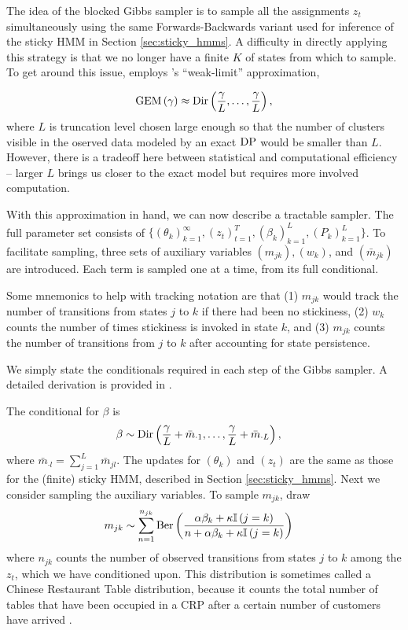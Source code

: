 \documentclass[14pt]{extreport}
\begin{document}
The idea of the blocked Gibbs sampler is to sample all the assignments $z_t$
simultaneously using the same Forwards-Backwards variant used for inference of
the sticky HMM in Section \ref{sec:sticky_hmms}. A difficulty in directly
applying this strategy is that we no longer have a finite $K$ of states from
which to sample. To get around this issue, \citep{fox2008hdp} employs
\citep{ishwaran2002exact}'s ``weak-limit'' approximation,

\begin{align*}
  \text{GEM}\left(\gamma\right) \approx \textnormal{Dir}\left(\frac{\gamma}{L}, \dots, \frac{\gamma}{L}\right),
\end{align*}
where $L$ is truncation level chosen large enough so that the number of clusters
visible in the oserved data modeled by an exact $\textnormal{DP}$ would be smaller than $L$.
However, there is a tradeoff here between statistical and computational
efficiency -- larger $L$ brings us closer to the exact model but requires more
involved computation.

With this approximation in hand, we can now describe a tractable sampler. The
full parameter set consists of $\{\left(\theta_k\right)_{k = 1}^{\infty},
\left(z_t\right)_{t = 1}^{T}, \left(\beta_{k}\right)_{k = 1}^{L},
\left(P_{k}\right)_{k = 1}^{L} \}$. To facilitate sampling, three sets of
auxiliary variables $\left(m_{jk}\right), \left(w_k\right)$, and
  $\left(\bar{m}_{jk}\right)$ are introduced. Each term is sampled one at a
  time, from its full conditional.

Some mnemonics to help with tracking notation are that (1) $m_{jk}$ would track
the number of transitions from states $j$ to $k$ if there had been no
stickiness, (2) $w_k$ counts the number of times stickiness is invoked in state
$k$, and (3) $m_{jk}$ counts the number of transitions from $j$ to $k$ after
accounting for state persistence.

We simply state the conditionals required in each step of the Gibbs sampler. A
detailed derivation is provided in \citep{fox2009bayesian}.

The conditional for $\beta$ is
\begin{align*}
  \beta &\sim \textnormal{Dir}\left(\frac{\gamma}{L} + \bar{m}_{\cdot 1}, \dots, \frac{\gamma}{L} + \bar{m}_{\cdot L}\right),
\end{align*}
where $\bar{m}_{\cdot l} = \sum_{j = 1}^{L} \bar{m}_{jl}$. The updates for
$\left(\theta_k\right)$ and $\left(z_t\right)$ are the same as those for the
(finite) sticky HMM, described in Section \ref{sec:sticky_hmms}. Next we
consider sampling the auxiliary variables.
To sample $m_{jk}$, draw
\begin{align*}
  m_{jk} &\sim \sum_{n = 1}^{n_{jk}} \textnormal{Ber}\left(\frac{\alpha \beta_{k} + \kappa\mathbb{I}\left({j = k}\right)}{n + \alpha \beta_{k} + \kappa \mathbb{I}\left({j = k}\right)}\right)
\end{align*}
where $n_{jk}$ counts the number of observed transitions from states $j$ to $k$
among the $z_{t}$, which we have conditioned upon. This distribution is
sometimes called a Chinese Restaurant Table distribution, because it counts the
total number of tables that have been occupied in a CRP after a certain number
of customers have arrived \citep{zhou2012augment}.
\end{document}
